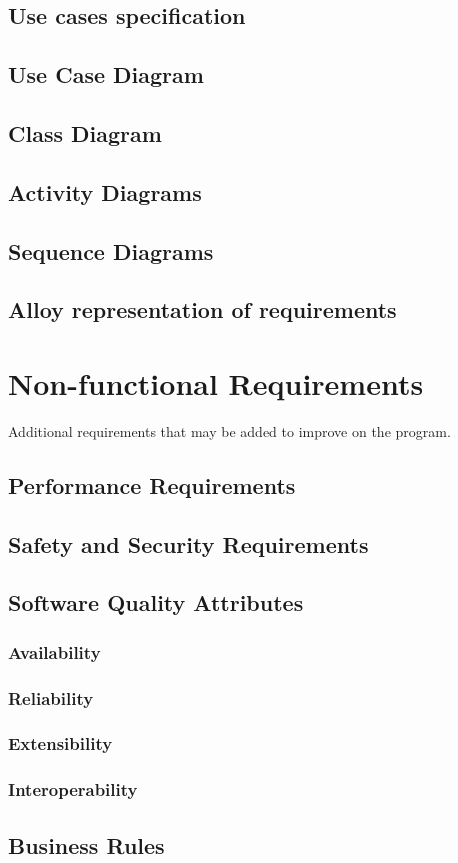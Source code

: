 \documentclass[12pt]{article}
\begin{document}
\subsection{Use cases specification}

\subsection{Use Case Diagram}
\subsection{Class Diagram}
\subsection{Activity Diagrams}
\subsection{Sequence Diagrams}
\subsection{Alloy representation of requirements}

\clearpage\section{Non-functional Requirements}
Additional requirements that may be added to improve on the program.
\subsection{Performance Requirements}
\subsection{Safety and Security Requirements}
\subsection{Software Quality Attributes}
\subsubsection{Availability}
\subsubsection{Reliability}
\subsubsection{Extensibility}
\subsubsection{Interoperability}
\subsection{Business Rules}
\end{document}
